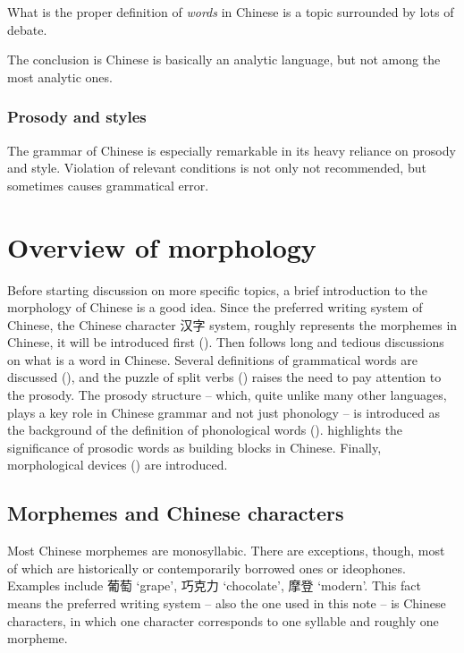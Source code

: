 \documentclass[UTF8, a4paper, oneside, scheme=plain]{ctexart}
\newcommand*{\term}[1]{\emph{#1}}
\newcommand{\translate}[1]{`#1'}
\begin{document}
What is the proper definition of \term{words} in Chinese 
is a topic surrounded by lots of debate. %

The conclusion is Chinese is basically an analytic language,
but not among the most analytic ones.

\subsubsection{Prosody and styles}

The grammar of Chinese is especially remarkable in its heavy reliance on prosody and style.
Violation of relevant conditions is not only not recommended,
but sometimes causes grammatical error.

\section{Overview of morphology}

Before starting discussion on more specific topics, 
a brief introduction to the morphology of Chinese is a good idea.
Since the preferred writing system of Chinese,
the Chinese character 汉字 system,
roughly represents the morphemes in Chinese,
it will be introduced first ().
Then follows long and tedious discussions on what is a word in Chinese.
Several definitions of grammatical words are discussed (),
and the puzzle of split verbs ()
raises the need to pay attention to the prosody.
The prosody structure 
-- which, quite unlike many other languages, plays a key role in Chinese grammar and not just phonology --
is introduced as the background of the definition of phonological words ().
highlights the significance of prosodic words as building blocks in Chinese.
Finally, morphological devices ()
are introduced.

\subsection{Morphemes and Chinese characters}\label{sec:morpheme-character}

Most Chinese morphemes are monosyllabic. 
There are exceptions, though, most of which are historically or contemporarily borrowed ones
or ideophones.
Examples include 
葡萄 \translate{grape},
巧克力 \translate{chocolate},
摩登 \translate{modern}.
This fact means the preferred writing system -- also the one used in this note --
is Chinese characters,
in which one character corresponds to one syllable
and roughly one morpheme.
\end{document}
